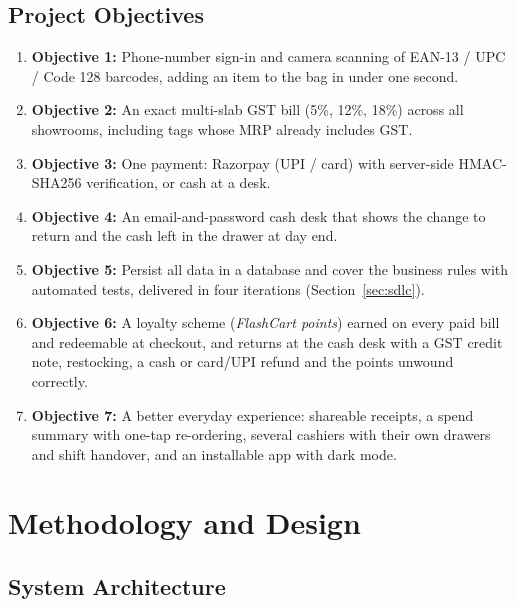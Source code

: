 \documentclass[12pt,letterpaper,twoside,openany]{report}
\begin{document}
\section{Project Objectives}
\begin{enumerate}[leftmargin=*]
  \item \textbf{Objective 1:} Phone-number sign-in and camera scanning of EAN-13 / UPC /
        Code 128 barcodes, adding an item to the bag in under one second.
  \item \textbf{Objective 2:} An exact multi-slab GST bill (5\%, 12\%, 18\%) across all
        showrooms, including tags whose MRP already includes GST.
  \item \textbf{Objective 3:} One payment: Razorpay (UPI / card) with server-side HMAC-SHA256
        verification, or cash at a desk.
  \item \textbf{Objective 4:} An email-and-password cash desk that shows the change to return
        and the cash left in the drawer at day end.
  \item \textbf{Objective 5:} Persist all data in a database and cover the business rules
        with automated tests, delivered in four iterations (Section~\ref{sec:sdlc}).
  \item \textbf{Objective 6:} A loyalty scheme (\emph{FlashCart points}) earned on every paid
        bill and redeemable at checkout, and returns at the cash desk with a GST credit note,
        restocking, a cash or card/UPI refund and the points unwound correctly.
  \item \textbf{Objective 7:} A better everyday experience: shareable receipts, a spend summary
        with one-tap re-ordering, several cashiers with their own drawers and shift handover,
        and an installable app with dark mode.
\end{enumerate}

\chapter{Methodology and Design}

\section{System Architecture}
\end{document}
